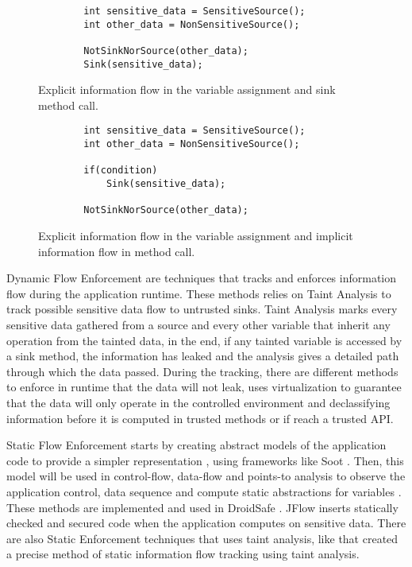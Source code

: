 \begin{figure}[ht] 
    \centering
    \begin{lstlisting}
        int sensitive_data = SensitiveSource();
        int other_data = NonSensitiveSource();

        NotSinkNorSource(other_data);
        Sink(sensitive_data);
    \end{lstlisting}
    \caption{Explicit information flow in the variable assignment and sink method call.}
    \label{figure:implicit}
    \vspace{4ex}
\end{figure}

\begin{figure}[ht]
    \centering
    \begin{lstlisting}
        int sensitive_data = SensitiveSource();
        int other_data = NonSensitiveSource();

        if(condition)
            Sink(sensitive_data);

        NotSinkNorSource(other_data);
    \end{lstlisting}
    \caption{Explicit information flow in the variable assignment and implicit information flow in method call.}
    \label{figure:explicit}
    \vspace{4ex}
\end{figure}

Dynamic Flow Enforcement are techniques that tracks and enforces information flow during the application runtime. These methods relies on Taint Analysis to track possible sensitive data flow to untrusted sinks. Taint Analysis marks every sensitive data gathered from a source and every other variable that inherit any operation from the tainted data, in the end, if any tainted variable is accessed by a sink method, the information has leaked and the analysis gives a detailed path through which the data passed. During the tracking, there are different methods to enforce in runtime that the data will not leak, \cite{fernandes2016flowfence} uses virtualization to guarantee that the data will only operate in the controlled environment and \cite{sun2017data} declassifying information before it is computed in trusted methods or if reach a trusted API.

Static Flow Enforcement starts by creating abstract models of the application code to provide a simpler representation \citep{myers1999jflow}, using frameworks like Soot \citep{vallee2000optimizing}. Then, this model will be used in control-flow, data-flow and points-to analysis to observe the application control, data sequence and compute static abstractions for variables \citep{li2017static}. These methods are implemented and used in DroidSafe \cite{gordon2015information}. JFlow \cite{myers1999jflow} inserts statically checked and secured code when the application computes on sensitive data. There are also Static Enforcement techniques that uses taint analysis, like \cite{arzt2014flowdroid} that created a precise method of static information flow tracking using taint analysis.

